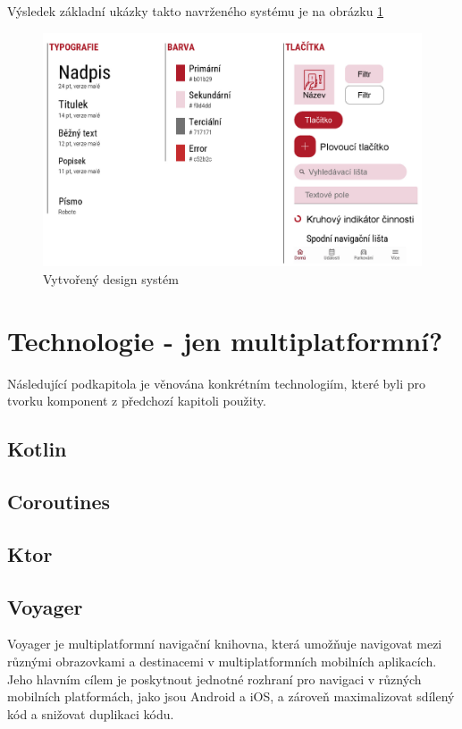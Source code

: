 Výsledek základní ukázky takto navrženého systému je na obrázku \ref{fig:design_system}

\begin{figure}[H]
  \centering
  \includegraphics[width=.99\textwidth]{design_system.jpg}
  \caption{Vytvořený design systém}
  \label{fig:design_system}
\end{figure}

\section{Technologie - jen multiplatformní? }
Následující podkapitola je věnována konkrétním technologiím, které byli pro tvorku komponent z předchozí kapitoli použity.

\subsection{Kotlin}
\subsection{Coroutines}
\subsection{Ktor}
\subsection{Voyager}
Voyager je multiplatformní navigační knihovna, která umožňuje navigovat mezi různými obrazovkami a destinacemi v multiplatformních mobilních
 aplikacích. \cite{voyager} Jeho hlavním cílem je poskytnout jednotné rozhraní pro navigaci v různých mobilních platformách, jako jsou Android a iOS, a 
 zároveň maximalizovat sdílený kód a snižovat duplikaci kódu.

